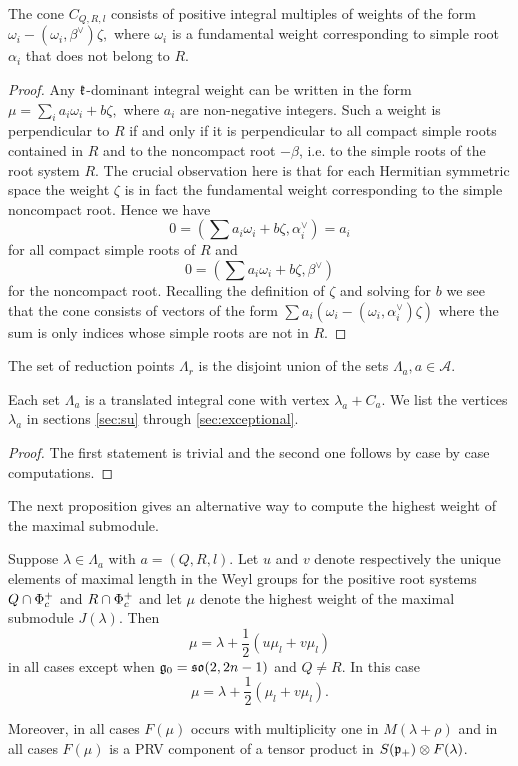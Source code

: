 \begin{lemma}
The cone $C_{Q, R, l}$ consists of positive integral multiples of weights of the form $\omega_i - (\omega_i, \beta^\vee) \zeta,$ where $\omega_i$ is a fundamental weight corresponding to simple root $\alpha_i$ that does not belong to $R$.
\end{lemma}
\begin{proof}
 Any  $\mathfrak{k}$-dominant integral weight can be written in the form $\mu = \sum_i a_i \omega_i + b \zeta,$ where $a_i$ are non-negative integers. Such a weight is perpendicular to $R$ if and only if it is perpendicular to all compact simple roots contained in $R$ and to the noncompact root $-\beta$, i.e. to the simple roots of the root system $R$. The crucial observation here is that for each Hermitian symmetric space the weight $\zeta$ is in fact the fundamental weight corresponding to the simple noncompact root. Hence we have 
\[
0 = \left(\sum a_i \omega_i + b \zeta, \alpha_i^\vee \right) = a_i 
\] 
for all compact simple roots of  $R$ and 
\[
0 = \left(\sum a_i \omega_i + b \zeta, \beta^\vee \right)
\]
for the noncompact root. Recalling the definition of $\zeta$ and solving for $b$ we see that the cone consists of vectors of the form $\sum a_i (\omega_i - (\omega_i, \alpha_i^\vee)\zeta)$ where the sum is only indices whose simple roots are not in $R$.
\end{proof}

\begin{proposition}
 The set of reduction points $\Lambda_r$ is the disjoint union of the sets $\Lambda_a, a\in\mathcal{A}$.

 Each set $\Lambda_a$ is a translated integral cone with vertex $\lambda_a + C_a$. We list the vertices $\lambda_a$ in sections \ref{sec:su} through \ref{sec:exceptional}.
\end{proposition}
\begin{proof}
 The first statement is trivial and the second one follows by case by case computations.
\end{proof}

The next proposition gives an alternative way to compute the highest weight of the maximal submodule.

\begin{proposition}
 Suppose $\lambda\in\Lambda_a$ with $a=(Q,R,l)$. Let $u$ and $v$ denote respectively the unique elements of maximal length in the Weyl groups for the positive root systems $Q\cap \Phi^+_c$ and $R\cap \Phi^+_c$ and let $\mu$ denote the highest weight of the maximal submodule $J(\lambda)$. Then
 \[
  \mu = \lambda + \frac{1}{2}(u \mu_l + v \mu_l)
 \]
 in all cases except when $\mathfrak{g}_0=\mathfrak{so}(2,2n-1)$ and $Q\neq R$. In this case
 \[
  \mu = \lambda + \frac{1}{2}(\mu_l + v\mu_l).
 \]

 Moreover, in all cases $F(\mu)$ occurs with multiplicity one in $M(\lambda+\rho)$ and in all cases $F(\mu)$ is a PRV component of a tensor product in $S(\mathfrak{p}_+)\otimes F(\lambda)$.
\end{proposition}

